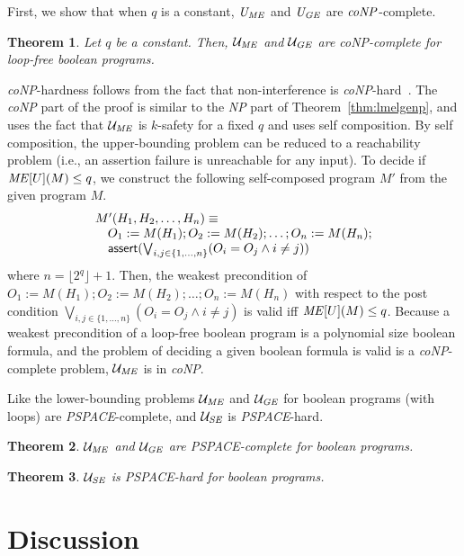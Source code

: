 \documentclass[]{eptcs}
\newcommand{\aset}[1]{\{{#1}\}}
\newtheorem{theorem}{Theorem}[section]
\begin{document}
First, we show that when $q$ is a constant, ${\it U}_{\it ME}$ and
${\it U}_{\it GE}$ are ${\it coNP}$-complete.
\begin{theorem}
\label{thm:umeugeconp}
  Let $q$ be a constant.  Then, $\mathcal{U}_{\it ME}$ and
  $\mathcal{U}_{\it GE}$ are {\it coNP}-complete for loop-free boolean
  programs.
\end{theorem}
{\it coNP}-hardness follows from the fact that non-interference is
{\it coNP}-hard~\cite{DBLP:conf/esorics/YasuokaT10}.  The {\it coNP}
part of the proof is similar to the {\it NP} part of
Theorem~\ref{thm:lmelgenp}, and uses the fact that $\mathcal{U}_{\it
  ME}$ is $k$-safety for a fixed $q$ and uses self composition.  By
self composition, the upper-bounding problem can be reduced to a
reachability problem (i.e., an assertion failure is unreachable for
any input).  To decide if ${\it ME}[U](M)\le q$, we construct the
following self-composed program $M'$ from the given program $M$.
\[
\begin{array}{l}
  M'(H_1,H_2,\dots,H_n)\equiv\\
  \quad O_1:=M(H_1);O_2:=M(H_2);\dots;O_n:=M(H_n);\\
  \quad {\sf assert}(\bigvee_{i,j\in\aset{1,\dots,n}}(O_i=O_j\wedge i\not=j))
\end{array}
\]
where $n=\lfloor 2^q\rfloor +1$.  Then, the weakest precondition of
$O_1:=M(H_1);O_2:=M(H_2);\dots;O_n:=M(H_n)$ with respect to the post
condition $\bigvee_{i,j\in\aset{1,\dots,n}}(O_i=O_j\wedge i\not=j)$ is
valid iff ${\it ME}[U](M)\le q$.  Because a weakest precondition of a
loop-free boolean program is a polynomial size boolean formula, and
the problem of deciding a given boolean formula is valid is a {\it
  coNP}-complete problem, $\mathcal{U}_{\it ME}$ is in {\it coNP}.

Like the lower-bounding problems $\mathcal{U}_{\it ME}$ and
$\mathcal{U}_{\it GE}$ for boolean programs (with loops) are {\it
  PSPACE}-complete, and $\mathcal{U}_{\it SE}$ is {\it PSPACE}-hard.
\begin{theorem}
\label{thm:umeugepspace}
  $\mathcal{U}_{\it ME}$ and $\mathcal{U}_{\it GE}$ are {\it
    PSPACE}-complete for boolean programs.
\end{theorem}
\begin{theorem}
\label{thm:usepspace}
$\mathcal{U}_{\it SE}$ is {\it PSPACE}-hard for boolean programs.
\end{theorem}

\section{Discussion}
\end{document}
